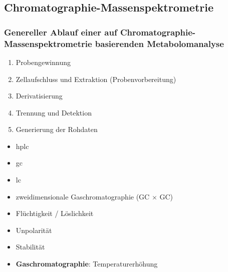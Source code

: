 \subsection{Chromatographie-Massenspektrometrie}
\subsubsection{Genereller Ablauf einer auf Chromatographie-Massenspektrometrie basierenden Metabolomanalyse}
\begin{mechanism}[title=Metabolitenbestimmung – allgemeiner Ablauf]
\begin{enumerate}
    \item Probengewinnung
    \item Zellaufschluss und Extraktion (Probenvorbereitung)
    \item Derivatisierung
    \item Trennung und Detektion
    \item Generierung der Rohdaten
\end{enumerate}
\end{mechanism}
\begin{mechanism}[title=Chromatographie: welche gibt es?]
\begin{itemize}
    \item \acrlong{hplc}
    \item \acrlong{gc}
    \item \acrlong{lc}
    \item zweidimensionale Gaschromatographie (GC $\times$ GC)
\end{itemize}
\end{mechanism}

\begin{mechanism}[title=Chromatographie: welche Eigenschaften müssen die Analyten haben?]
\begin{itemize}
    \item Flüchtigkeit / Löslichkeit 
    \item Unpolarität
    \item Stabilität
\end{itemize}
\end{mechanism}

\begin{mechanism}[title=Chromatographie: wie werden die Analyten eluiert?]
\begin{itemize}
    \item \textbf{Gaschromatographie}: Temperaturerhöhung
\end{itemize}
\end{mechanism} 

